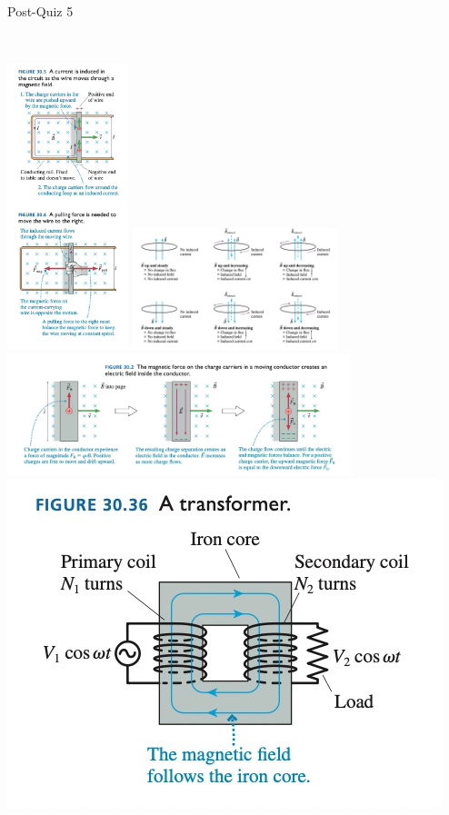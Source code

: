 \documentclass{article}
\begin{document}
\begin{section}{Post-Quiz 5}
\begin{tabular}{|c|c|}
	 \hline
 \end{tabular}
 \\
 \includegraphics[width=100pt]{final_cheet_sheet_resources/wdvrjkvxydvnmzcxxmvblfduelscmiva.jpg}
 \includegraphics[height=100pt]{final_cheet_sheet_resources/vudruzxbemysxjzyoaltoysmligfugzr.jpg}
 \includegraphics[height=100pt]{final_cheet_sheet_resources/zqygyosdcfxstmovemujxntoqndcyvgs.jpg}
 \includegraphics[width=\linewidth]{final_cheet_sheet_resources/tuicoixlhjdxpxepfpdegieiomxwrgca.jpg}

\end{section}
\end{document}

